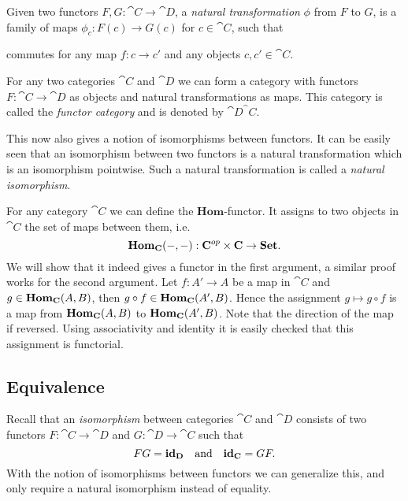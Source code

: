 \begin{definition}
	Given two functors $F, G: \cat{C} \to \cat{D}$, a \emph{natural transformation} $\phi$ from $F$ to $G$, is a family of maps $\phi_c : F(c) \to G(c)$ for $c \in \cat{C}$, such that
	\begin{center}
	\end{center}
	commutes for any map $f: c \to c'$ and any objects $c, c' \in \cat{C}$.
\end{definition}

For any two categories $\cat{C}$ and $\cat{D}$ we can form a category with functors $F: \cat{C} \to \cat{D}$ as objects and natural transformations as maps. This category is called the \emph{functor category} and is denoted by $\cat{D}^\cat{C}$.

This now also gives a notion of isomorphisms between functors. It can be easily seen that an isomorphism between two functors is a natural transformation which is an isomorphism pointwise. Such a natural transformation is called a \emph{natural isomorphism}.

For any category $\cat{C}$ we can define the $\mathbf{Hom}$-functor. It assigns to two objects in $\cat{C}$ the set of maps between them, i.e.
$$ \mathbf{Hom}_{\mathbf{C}}(-, -): \mathbf{C}^{op} \times \mathbf{C} \to \mathbf{Set}. $$
We will show that it indeed gives a functor in the first argument, a similar proof works for the second argument. Let $f: A' \to A$ be a map in $\cat{C}$ and $g \in \mathbf{Hom}_{\mathbf{C}}(A, B)$, then $g \circ f \in \mathbf{Hom}_{\mathbf{C}}(A', B)$. Hence the assignment $g \mapsto g \circ f$ is a map from $\mathbf{Hom}_{\mathbf{C}}(A, B)$ to $\mathbf{Hom}_{\mathbf{C}}(A', B)$. Note that the direction of the map if reversed. Using associativity and identity it is easily checked that this assignment is functorial.

\subsection{Equivalence}
Recall that an \emph{isomorphism} between categories $\cat{C}$ and $\cat{D}$ consists of two functors $F:\cat{C} \to \cat{D}$ and $G: \cat{D} \to \cat{C}$ such that
$$ FG = \mathbf{id}_{\mathbf{D}} \quad\text{and}\quad \mathbf{id}_{\mathbf{C}} = GF. $$
With the notion of isomorphisms between functors we can generalize this, and only require a natural isomorphism instead of equality.

